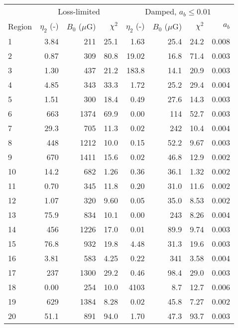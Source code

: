 \begin{tabular}{@{} l rrr rrrr @{}}
\toprule
{} & \multicolumn{3}{c}{Loss-limited}
   & \multicolumn{4}{c}{Damped, $a_b \leq 0.01$} \\
\cmidrule(lr){2-4} \cmidrule(l){5-8}
Region & $\eta_2$ (-) & $B_0$ ($\mu$G) & $\chi^2$
       & $\eta_2$ (-) & $B_0$ ($\mu$G) & $\chi^2$ & $a_b$ \\
\midrule
 1 & 3.84 & 211  & 25.1 & 1.63  & 25.4 & 24.2 & 0.008 \\
 2 & 0.87 & 309  & 80.8 & 19.02 & 16.8 & 71.4 & 0.003 \\
 3 & 1.30 & 437  & 21.2 & 183.8 & 14.1 & 20.9 & 0.003 \\
\cmidrule{1-8}
 4 & 4.85 & 343  & 33.3 & 1.72  & 25.2 & 29.4 & 0.004 \\
 5 & 1.51 & 300  & 18.4 & 0.49  & 27.6 & 14.3 & 0.003 \\
 6 & 663  & 1374 & 69.9 & 0.00  & 114  & 52.7 & 0.003 \\
 7 & 29.3 & 705  & 11.3 & 0.02  & 242  & 10.4 & 0.004 \\
 8 & 448  & 1212 & 10.0 & 0.15  & 52.2 & 9.67 & 0.003 \\
 9 & 670  & 1411 & 15.6 & 0.02  & 46.8 & 12.9 & 0.002 \\
10 & 14.2 & 682  & 1.26 & 0.36  & 36.1 & 1.32 & 0.002 \\
\cmidrule{1-8}
11 & 0.70 & 345  & 11.8 & 0.20  & 31.0 & 11.6 & 0.002 \\
12 & 1.07 & 320  & 9.60 & 0.05  & 35.0 & 8.53 & 0.002 \\
13 & 75.9 & 834  & 10.1 & 0.00  & 243  & 8.26 & 0.004 \\
\cmidrule{1-8}
14 & 456  & 1226 & 17.0 & 0.01  & 89.9 & 9.74 & 0.003 \\
15 & 76.8 & 932  & 19.8 & 4.48  & 31.3 & 19.6 & 0.003 \\
16 & 3.81 & 583  & 4.25 & 0.22  & 341  & 3.58 & 0.004 \\
17 & 237  & 1300 & 29.2 & 0.46  & 98.4 & 29.0 & 0.003 \\
\cmidrule{1-8}
18 & 0.00 & 254  & 10.0 & 4103  & 8.7  & 12.7 & 0.006 \\
19 &  629 & 1384 & 8.28 & 0.02  & 45.8 & 7.27 & 0.002 \\
20 & 51.1 & 891  & 94.0 & 1.70  & 47.3 & 93.7 & 0.003 \\
\bottomrule
\end{tabular}
